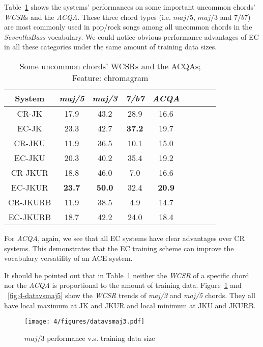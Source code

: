  \label{sec:4-scper}
Table~\ref{tab:4-ltres} shows the systems' performances on some important uncommon chords' \textit{WCSR}s and the \textit{ACQA}. These three chord types (i.e. $maj/5$, $maj/3$ and $7/b7$) are most commonly used in pop/rock songs among all uncommon chords in the \textit{SeventhsBass} vocabulary. We could notice obvious performance advantages of EC in all these categories under the same amount of training data sizes.
\begin{table}[htb]
	\caption{Some uncommon chords' WCSRs and the ACQAs; Feature: chromagram}
	\label{tab:4-ltres}
	\centering
	\scriptsize
	\begin{tabular}{|c|c|c|c|c|c|c|c|c|}\hline
		System & \textit{maj/5} & \textit{maj/3} & \textit{7/b7} & \textit{ACQA}\\ \hline
		CR-JK & 17.9 & 43.2 & 28.9 & 16.6\\ \hline
		EC-JK & 23.3 & 42.7 & \textbf{37.2} & 19.7\\ \hline
		CR-JKU & 11.9 & 36.5 & 10.1 & 15.0\\ \hline
		EC-JKU & 20.3 & 40.2 & 35.4 & 19.2\\ \hline
		CR-JKUR & 18.8 & 46.0 & 7.0 & 16.6\\ \hline
		EC-JKUR & \textbf{23.7} & \textbf{50.0} & 32.4 & \textbf{20.9}\\ \hline
		CR-JKURB & 11.9 & 38.5 & 4.9 & 14.7\\ \hline
		EC-JKURB & 18.7 & 42.2 & 24.0 & 18.4\\ \hline
	\end{tabular}
\end{table}

For \textit{ACQA}, again, we see that all EC systems have clear advantages over CR systems. This demonstrates that the EC training scheme can improve the vocabulary versatility of an ACE system.

It should be pointed out that in Table~\ref{tab:4-ltres} neither the \textit{WCSR} of a specific chord nor the \textit{ACQA} is proportional to the amount of training data. Figure~\ref{fig:4-datavsmaj3} and ~\ref{fig:4-datavsmaj5} show the \textit{WCSR} trends of \textit{maj/3} and \textit{maj/5} chords. They all have local maximum at JK and JKUR and local minimum at JKU and JKURB.

\begin{figure}[htb]
	\centering
	\texttt{[image: 4/figures/datavsmaj3.pdf]}
	\caption{$maj/3$ performance v.s. training data size}
	\label{fig:4-datavsmaj3}
\end{figure}

